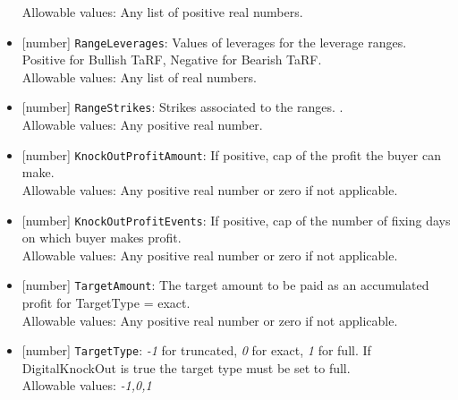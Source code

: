 \begin{itemize}
    Allowable values: Any list of positive real numbers.
    \item{}[number] \lstinline!RangeLeverages!: Values of leverages for the leverage ranges. Positive for Bullish TaRF, Negative for
      Bearish TaRF. \\
    Allowable values: Any list of real numbers.
    \item{}[number] \lstinline!RangeStrikes!: Strikes associated to the ranges. \emph{}. \\
    Allowable values: Any positive real number.
    \item{}[number] \lstinline!KnockOutProfitAmount!: If positive, cap of the profit the buyer can make. \\
    Allowable values: Any positive real number or zero if not applicable.
    \item{}[number] \lstinline!KnockOutProfitEvents!: If positive, cap of the number of fixing days on which buyer makes profit. \\
    Allowable values: Any positive real number or zero if not applicable.
    \item{}[number] \lstinline!TargetAmount!: The target amount to be paid as an accumulated profit for TargetType = exact. \\
    Allowable values: Any positive real number or zero if not applicable.
    \item{}[number] \lstinline!TargetType!: \emph{-1} for truncated, \emph{0} for exact, \emph{1} for full. If DigitalKnockOut is
      true the target type must be set to full. \\
    Allowable values: \emph{-1,0,1}
\end{itemize}
